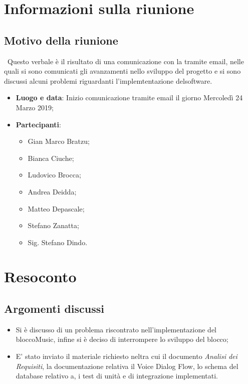\documentclass[a4paper,12pt]{article}
\begin{document}
	\tableofcontents
	\cleardoublepage
	\section{Informazioni sulla riunione}
\subsection{Motivo della riunione}\ Questo verbale è il risultato di una comunicazione con la  tramite email, nelle quali si sono comunicati gli avanzamenti nello sviluppo del progetto e si sono discussi alcuni problemi riguardanti l'implemtentazione delsoftware.

\begin{itemize}
	\item \textbf{Luogo e data}: Inizio comunicazione tramite email il giorno Mercoledì 24 Marzo 2019;
	\item \textbf{Partecipanti}:  
	\begin{itemize}
		\item Gian Marco Bratzu;
		\item Bianca Ciuche;
		\item Ludovico Brocca;
		\item Andrea Deidda;
		\item Matteo Depascale;
		\item Stefano Zanatta;
		\item Sig. Stefano Dindo.
	\end{itemize}
\end{itemize}
	
	
	\section{Resoconto}
	\subsection{Argomenti discussi}
	\begin{itemize}		
		\item Si è discusso di un problema riscontrato nell'implementazione del bloccoMusic, infine si è deciso di interrompere lo sviluppo del blocco;
		\item E' stato inviato il materiale richiesto neltra cui il documento \emph{Analisi dei Requisiti}, la documentazione relativa il Voice Dialog Flow, lo schema del database relativo a, i test di unità e di integrazione implementati.
	\end{itemize}
	
\end{document}

